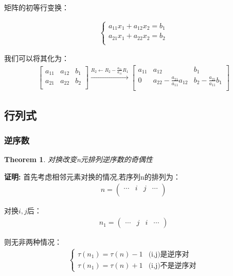 \documentclass[10pt, a4paper, oneside, UTF8]{ctexbook}
\newtheorem{theorem}{Theorem}[section]
\begin{document}
矩阵的初等行变换：

\begin{align}
  \begin{cases}
    a_{11}x_1+a_{12}x_2 = b_1 \\
    a_{21}x_1+a_{22}x_2 = b_2 \\
  \end{cases}
\end{align}

我们可以将其化为：
\begin{align}
  \begin{bmatrix}
    a_{11} & a_{12} & b_1 \\
    a_{21} & a_{22} & b_2 \\
  \end{bmatrix}
  \xrightarrow{R_2 \leftarrow R_2 - \frac{a_{21}}{a_{11}} R_1}
  \begin{bmatrix}
    a_{11} & a_{12} & b_1 \\
    0 & a_{22} - \frac{a_{21}}{a_{11}} a_{12} & b_2 -
    \frac{a_{21}}{a_{11}} b_1 \\
  \end{bmatrix}
\end{align}

\subsection{行列式}
\subsubsection{逆序数}

\begin{theorem}
  对换改变n元排列逆序数的奇偶性
\end{theorem}

\noindent\textbf{证明:}
首先考虑相邻元素对换的情况,若序列n的排列为：
\begin{align}
  n =
  \begin{pmatrix}
    \cdots &i & j&\cdots\\
  \end{pmatrix}
\end{align}

对换$i,j$后：
\begin{align}
  n_{1} =
  \begin{pmatrix}
    \cdots&j&i&\cdots
  \end{pmatrix}
\end{align}

则无非两种情况：
\begin{align}
  \begin{cases}
    \tau(n_{1}) = \tau(n) - 1 & \text{(i,j)是逆序对} \\
    \tau(n_{1}) = \tau(n) + 1 & \text{(i,j)不是逆序对}
  \end{cases}
\end{align}
\end{document}

